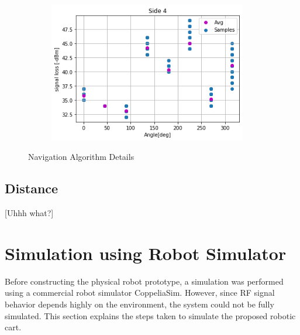 \begin{figure}
\begin{subfigure}{0.50\textwidth}
        \label{fig:Side3Dat}
    \end{subfigure}%
    \begin{subfigure}{0.50\textwidth}
        \centering
        \includegraphics[width=0.95\textwidth]{figs/img/Side4_Data.png}
        \label{fig:Side4Dat}
    \end{subfigure}
    \caption{Navigation Algorithm Details}
    \label{fig:SensorDataGraphs}
\end{figure}

\subsection{Distance}


[Uhhh what?]


\section{Simulation using Robot Simulator}

Before constructing the physical robot prototype, a simulation was performed using a commercial robot simulator CoppeliaSim. However, since RF signal behavior depends highly on the environment, the system could not be fully simulated. This section explains the steps taken to simulate the proposed robotic cart.

